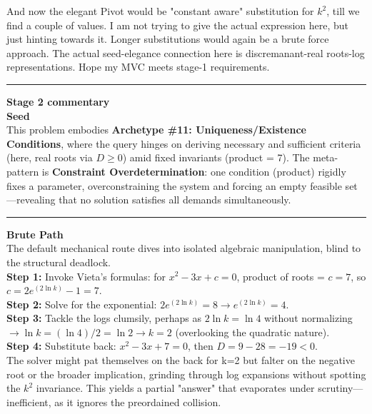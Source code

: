 \documentclass{article}
\begin{document}
\noindent And now the elegant Pivot would be "constant aware" substitution for $k^2$, till we find a couple of values. I am not trying to give the actual expression here, but just hinting towards it. Longer substitutions would again be a brute force approach. The actual seed-elegance connection here is discremanant-real roots-log representations. Hope my MVC meets stage-1 requirements. \\

\noindent \rule{\textwidth}{0.4pt}

\noindent \textbf{Stage 2 commentary} \\

\noindent \textbf{Seed} \\

\noindent This problem embodies \textbf{Archetype \#11: Uniqueness/Existence Conditions}, where the query hinges on deriving necessary and sufficient criteria (here, real roots via $D \ge 0$) amid fixed invariants (product = 7). The meta-pattern is \textbf{Constraint Overdetermination}: one condition (product) rigidly fixes a parameter, overconstraining the system and forcing an empty feasible set—revealing that no solution satisfies all demands simultaneously. \\

\noindent \rule{\textwidth}{0.4pt}

\noindent \textbf{Brute Path} \\

\noindent The default mechanical route dives into isolated algebraic manipulation, blind to the structural deadlock. \\

\noindent \textbf{Step 1:} Invoke Vieta's formulas: for $x^2 - 3x + c = 0$, product of roots = $c = 7$, so $c = 2e^{(2 \ln k)} - 1 = 7$. \\

\noindent \textbf{Step 2:} Solve for the exponential: $2e^{(2 \ln k)} = 8 \to e^{(2 \ln k)} = 4$. \\

\noindent \textbf{Step 3:} Tackle the logs clumsily, perhaps as $2 \ln k = \ln 4$ without normalizing $\to \ln k = (\ln 4)/2 = \ln 2 \to k = 2$ (overlooking the quadratic nature). \\

\noindent \textbf{Step 4:} Substitute back: $x^2 - 3x + 7 = 0$, then $D = 9 - 28 = -19 < 0$. \\

\noindent The solver might pat themselves on the back for k=2 but falter on the negative root or the broader implication, grinding through log expansions without spotting the $k^2$ invariance. This yields a partial "answer" that evaporates under scrutiny—inefficient, as it ignores the preordained collision. \\
\end{document}
